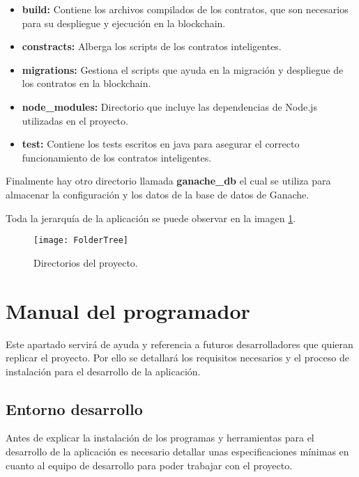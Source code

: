 \begin{itemize}

\item \textbf{build:} Contiene los archivos compilados de los contratos, que son necesarios para su despliegue y ejecución en la blockchain.

\item \textbf{constracts:} Alberga los scripts de los contratos inteligentes.

\item \textbf{migrations:} Gestiona el scripts que ayuda en la migración y despliegue de los contratos en la blockchain.

\item \textbf{node\_modules:} Directorio que incluye las dependencias de Node.js utilizadas en el proyecto.

\item \textbf{test:} Contiene los tests escritos en java para asegurar el correcto funcionamiento de los contratos inteligentes.

\end{itemize}

Finalmente hay otro directorio llamada \textbf{ganache\_db} el cual se utiliza para almacenar la configuración y los datos de la base de datos de Ganache.

Toda la jerarquía de la aplicación se puede observar en la imagen \ref{img:FolderTree}.

\begin{figure}[h]
	\label{img:FolderTree}
	\centering
	\texttt{[image: FolderTree]}
	\caption[Directorios del proyecto]{Directorios del proyecto.}
\end{figure}


\section{Manual del programador}

Este apartado servirá de ayuda y referencia a futuros desarrolladores que quieran replicar el proyecto. 
Por ello se detallará los requisitos necesarios y el proceso de instalación para el desarrollo de la aplicación. 

\subsection{Entorno desarrollo}

Antes de explicar la instalación de los programas y herramientas para el desarrollo de la aplicación es necesario detallar unas especificaciones mínimas en cuanto al equipo de desarrollo para poder trabajar con el proyecto.

